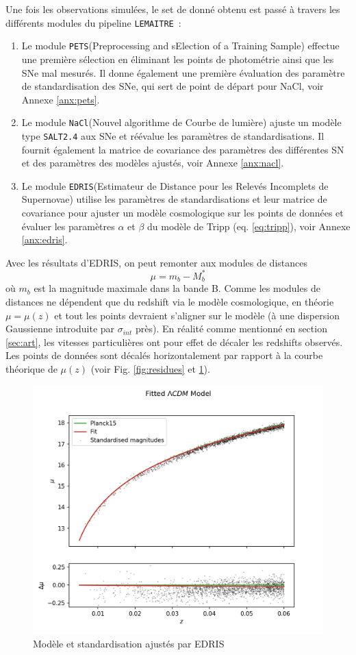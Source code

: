 \documentclass{book}
\def\lemaitre{\texttt{LEMAITRE}\xspace}
\def\pets{\texttt{PETS}\xspace}
\def\nacl{\texttt{NaCl}\xspace}
\def\edris{\texttt{EDRIS}\xspace}
\def\saltd{\texttt{SALT2.4}\xspace}
\begin{document}
Une fois les observations simulées, le set de donné obtenu est passé à travers les différents modules du pipeline \lemaitre~:
\begin{enumerate}
    \item Le module \pets (Preprocessing and sElection of a Training Sample) effectue une première sélection en éliminant les points de photométrie ainsi que les SNe mal mesurés. Il donne également une première évaluation des paramètre de standardisation des SNe, qui sert de point de départ pour NaCl, voir Annexe \ref{anx:pets}.
    \item Le module \nacl (Nouvel algorithme de Courbe de lumière) ajuste un modèle type \saltd aux SNe et réévalue les paramètres de standardisations. Il fournit également la matrice de covariance des paramètres des différentes SN et des paramètres des modèles ajustés, voir Annexe \ref{anx:nacl}.
    \item Le module \edris (Estimateur de Distance pour les Relevés Incomplets de Supernovae) utilise les paramètres de standardisations et leur matrice de covariance pour ajuster un modèle cosmologique sur les points de données et évaluer les paramètres $\alpha$ et $\beta$ du modèle de Tripp (eq. \ref{eq:tripp}), voir Annexe \ref{anx:edris}.
\end{enumerate}

Avec les résultats d'EDRIS, on peut remonter aux modules de distances
\begin{equation}
    \mu = m_b - M_b^*
\end{equation}
où $m_b$ est la magnitude maximale dans la bande B.
Comme les modules de distances ne dépendent que du redshift via le modèle cosmologique, en théorie $\mu = \mu(z)$ et tout les points devraient s'aligner sur le modèle (à une dispersion Gaussienne introduite par $\sigma_{int}$ près). En réalité comme mentionné en section \ref{sec:art}, les vitesses particulières ont pour effet de décaler les redshifts observés. Les points de données sont décalés horizontalement par rapport à la courbe théorique de $\mu(z)$ (voir Fig. \ref{fig:residues} et \ref{fig:edris_fit}).

\begin{figure}
    \centering
    \includegraphics[width=0.8\linewidth]{figures/edris_model_fit.png}
    \caption{Modèle et standardisation ajustés par EDRIS}
    \label{fig:edris_fit}
\end{figure}
\end{document}
